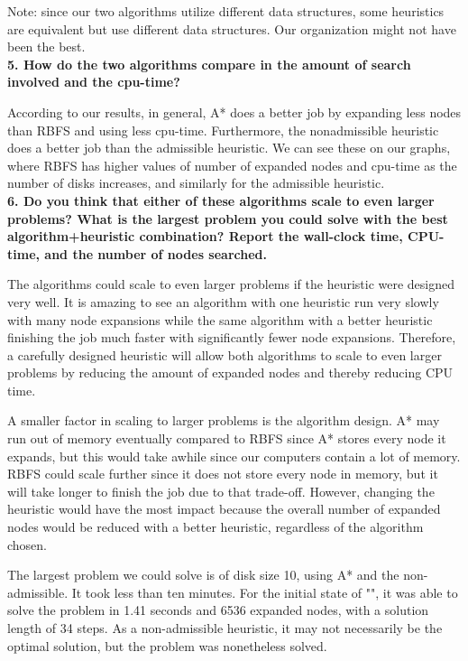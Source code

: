 Note: since our two algorithms utilize different data structures, some heuristics are equivalent but use different data structures. Our organization might not have been the best.\\

\textbf{5. How do the two algorithms compare in the amount of search involved and the cpu-time?}

According to our results, in general, A* does a better job by expanding less nodes than RBFS and using less cpu-time. Furthermore, the nonadmissible heuristic does a better job than the admissible heuristic. We can see these on our graphs, where RBFS has higher values of number of expanded nodes and cpu-time as the number of disks increases, and similarly for the admissible heuristic.\\

\textbf{6. Do you think that either of these algorithms scale to even larger problems? What is the largest problem you could solve with the best algorithm+heuristic combination? Report the wall-clock time, CPU-time, and the number of nodes searched.}

The algorithms could scale to even larger problems if the heuristic were designed very well. It is amazing to see an algorithm with one heuristic run very slowly with many node expansions while the same algorithm with a better heuristic finishing the job much faster with significantly fewer node expansions. Therefore, a carefully designed heuristic will allow both algorithms to scale to even larger problems by reducing the amount of expanded nodes and thereby reducing CPU time.

A smaller factor in scaling to larger problems is the algorithm design. A* may run out of memory eventually compared to RBFS since A* stores every node it expands, but this would take awhile since our computers contain a lot of memory. RBFS could scale further since it does not store every node in memory, but it will take longer to finish the job due to that trade-off. However, changing the heuristic would have the most impact because the overall number of expanded nodes would be reduced with a better heuristic, regardless of the algorithm chosen.

The largest problem we could solve is of disk size 10, using A* and the non-admissible. It took less than ten minutes. For the initial state of "", it was able to solve the problem in 1.41 seconds and 6536 expanded nodes, with a solution length of 34 steps. As a non-admissible heuristic, it may not necessarily be the optimal solution, but the problem was nonetheless solved.

